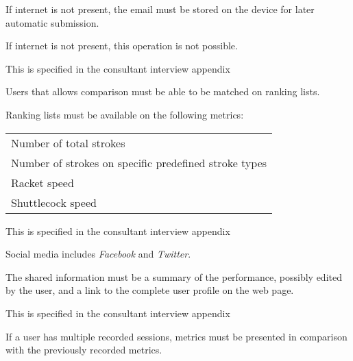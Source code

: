 If internet is not present, the email must be stored on the device for later automatic submission.


If internet is not present, this operation is not possible.


This  is specified in the consultant interview appendix 

Users that allows comparison must be able to be matched on ranking lists.

Ranking lists must be available on the following metrics: \newline
\begin{tabularx}{\textwidth}{X}
    Number of total strokes \\
    Number of strokes on specific predefined stroke types \\
    Racket speed \\
    Shuttlecock speed \\
\end{tabularx}


This  is specified in the consultant interview appendix 

Social media includes \textit{Facebook} and \textit{Twitter}.

The shared information must be a summary of the performance, possibly edited by the user, and a link to the complete user profile on the web page.


This  is specified in the consultant interview appendix 

If a user has multiple recorded sessions, metrics must be presented in comparison with the previously recorded metrics.
